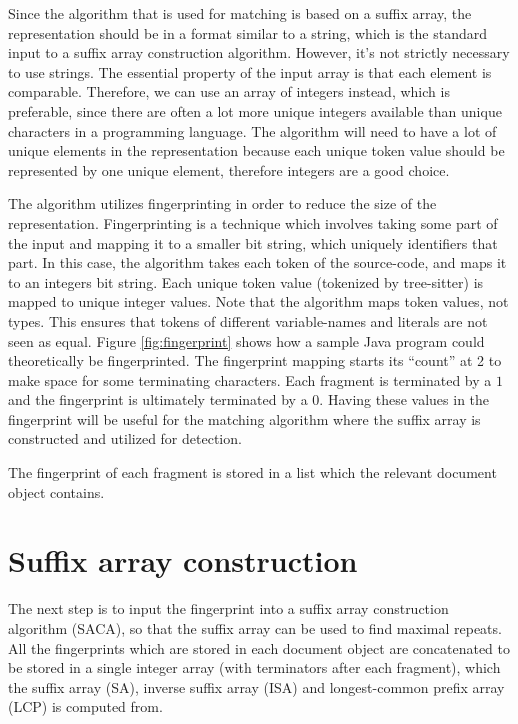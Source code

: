 Since the algorithm that is used for matching is based on a suffix array, the
representation should be in a format similar to a string, which is the standard input to a
suffix array construction algorithm. However, it's not strictly necessary to use strings.
The essential property of the input array is that each element is comparable. Therefore,
we can use an array of integers instead, which is preferable, since there are often a lot
more unique integers available than unique characters in a programming language. The
algorithm will need to have a lot of unique elements in the representation because each
unique token value should be represented by one unique element, therefore integers are a
good choice.


The algorithm utilizes fingerprinting in order to reduce the size of the representation.
Fingerprinting is a technique which involves taking some part of the input and mapping it
to a smaller bit string, which uniquely identifiers that part. In this case, the algorithm
takes each token of the source-code, and maps it to an integers bit string. Each unique
token value (tokenized by tree-sitter) is mapped to unique integer values. Note that the
algorithm maps token values, not types. This ensures that tokens of different
variable-names and literals are not seen as equal. Figure \ref{fig:fingerprint} shows how
a sample Java program could theoretically be fingerprinted. The fingerprint mapping starts
its ``count'' at 2 to make space for some terminating characters. Each fragment is
terminated by a $1$ and the fingerprint is ultimately terminated by a $0$. Having these
values in the fingerprint will be useful for the matching algorithm where the suffix array
is constructed and utilized for detection.

The fingerprint of each fragment is stored in a list which the relevant document object
contains.

\section{Suffix array construction}

The next step is to input the fingerprint into a suffix array construction algorithm
(SACA), so that the suffix array can be used to find maximal repeats. All the fingerprints
which are stored in each document object are concatenated to be stored in a single integer
array (with terminators after each fragment), which the suffix array (SA), inverse suffix
array (ISA) and longest-common prefix array (LCP) is computed from.

